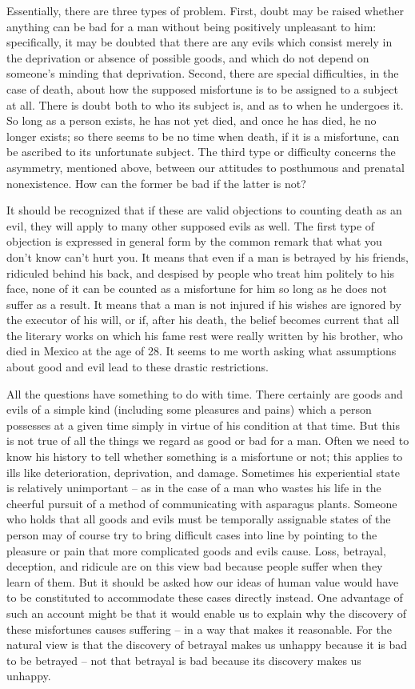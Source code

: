 Essentially, there are three types of problem. First, doubt may be raised
whether anything can be bad for a man without being positively unpleasant to
him: specifically, it may be doubted that there are any evils which consist
merely in the deprivation or absence of possible goods, and which do not
depend on someone's minding that deprivation. Second, there are special
difficulties, in the case of death, about how the supposed misfortune is to be
assigned to a subject at all. There is doubt both to who its subject is, and as to
when he undergoes it. So long as a person exists, he has not yet died, and
once he has died, he no longer exists; so there seems to be no time when
death, if it is a misfortune, can be ascribed to its unfortunate subject. The third
type or difficulty concerns the asymmetry, mentioned above, between our
attitudes to posthumous and prenatal nonexistence. How can the former be
bad if the latter is not?

It should be recognized that if these are valid objections to counting death as
an evil, they will apply to many other supposed evils as well. The first type of
objection is expressed in general form by the common remark that what you
don't know can't hurt you. It means that even if a man is betrayed by his friends,
ridiculed behind his back, and despised by people who treat him politely to his
face, none of it can be counted as a misfortune for him so long as he does not
suffer as a result. It means that a man is not injured if his wishes are ignored
by the executor of his will, or if, after his death, the belief becomes current that
all the literary works on which his fame rest were really written by his brother,
who died in Mexico at the age of 28. It seems to me worth asking what
assumptions about good and evil lead to these drastic restrictions.

All the questions have something to do with time. There certainly are goods
and evils of a simple kind (including some pleasures and pains) which a person
possesses at a given time simply in virtue of his condition at that time. But this
is not true of all the things we regard as good or bad for a man. Often we need to know his history to tell whether something is a misfortune or not; this applies
to ills like deterioration, deprivation, and damage. Sometimes his experiential
state is relatively unimportant – as in the case of a man who wastes his life in
the cheerful pursuit of a method of communicating with asparagus plants.
Someone who holds that all goods and evils must be temporally assignable
states of the person may of course try to bring difficult cases into line by pointing
to the pleasure or pain that more complicated goods and evils cause. Loss,
betrayal, deception, and ridicule are on this view bad because people suffer
when they learn of them. But it should be asked how our ideas of human value
would have to be constituted to accommodate these cases directly instead.
One advantage of such an account might be that it would enable us to explain
why the discovery of these misfortunes causes suffering – in a way that makes
it reasonable. For the natural view is that the discovery of betrayal makes us
unhappy because it is bad to be betrayed – not that betrayal is bad because its
discovery makes us unhappy.

